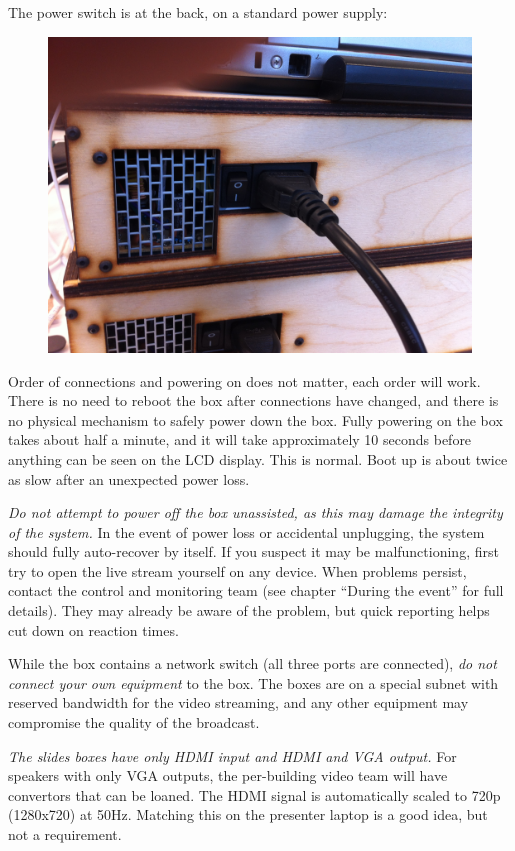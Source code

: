 \documentclass{article}
\begin{document}
The power switch is at the back, on a standard power supply:
\begin{figure}[H]
  \centering
  \includegraphics[width = 120mm]{videobox_psu.jpg}
\end{figure}

Order of connections and powering on does not matter, each order will work. There is no need to reboot the box after connections have changed, and there is no physical mechanism to safely power down the box.
Fully powering on the box takes about half a minute, and it will take approximately 10 seconds before anything can be seen on the LCD display. This is normal. Boot up is about twice as slow after an unexpected power loss.

\emph{Do not attempt to power off the box unassisted, as this may damage the integrity of the system.}
In the event of power loss or accidental unplugging, the system should fully auto-recover by itself. If you suspect it may be malfunctioning, first try to open the live stream yourself on any device. When problems persist, contact the control and monitoring team (see chapter ``During the event'' for full details). They may already be aware of the problem, but quick reporting helps cut down on reaction times.

While the box contains a network switch (all three ports are connected), \emph{do not connect your own equipment} to the box. The boxes are on a special subnet with reserved bandwidth for the video streaming, and any other equipment may compromise the quality of the broadcast.

\emph{The slides boxes have only HDMI input and HDMI and VGA output.}
For speakers with only VGA outputs, the per-building video team will have convertors that can be loaned.
The HDMI signal is automatically scaled to 720p (1280x720) at 50Hz. Matching this on the presenter laptop is a good idea, but not a requirement.
\end{document}
